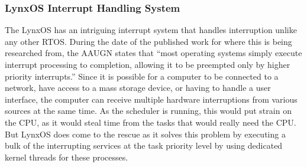 \documentclass[12pt]{article}
\begin{document}
\begin{table}[H]

\label{tab:schEx}
\caption[scheduling example]{Scheduling example is Lynx OS}

\noindent{}

\end{table}


\subsubsection{LynxOS Interrupt Handling System}

The LynxOS has an intriguing interrupt system that handles interruption unlike any other
RTOS. During the date of the published work for where this is being researched from, the
AAUGN states that “most operating systems simply execute interrupt processing to completion,
allowing it to be preempted only by higher priority interrupts.” Since it is possible for a
computer to be connected to a network, have access to a mass storage device, or having to handle
a user interface, the computer can receive multiple hardware interruptions from various sources
at the same time. As the scheduler is running, this would put strain on the CPU, as it would steal
time from the tasks that would really need the CPU. But LynxOS does come to the rescue as it
solves this problem by executing a bulk of the interrupting services at the task priority level by
using dedicated kernel threads for these processes.\\
\end{document}
